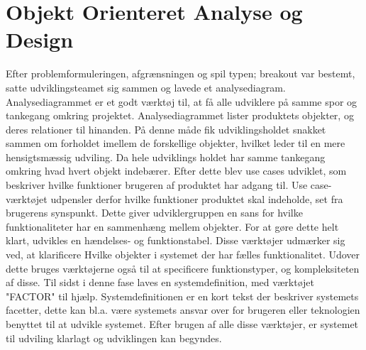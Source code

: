 \section{Objekt Orienteret Analyse og Design}
Efter problemformuleringen, afgrænsningen  og spil typen; breakout var bestemt, satte udviklingsteamet sig sammen og lavede et analysediagram. Analysediagrammet er et godt værktøj til, at få alle udviklere på samme spor og tankegang omkring projektet. Analysediagrammet lister produktets objekter, og deres relationer til hinanden. På denne måde fik udviklingsholdet snakket sammen om forholdet imellem de forskellige objekter, hvilket leder til en mere hensigtsmæssig udviling. Da hele udviklings holdet har samme tankegang omkring hvad hvert objekt indebærer. Efter dette blev use cases udviklet, som beskriver hvilke funktioner brugeren af produktet har adgang til. Use case-værktøjet udpensler derfor hvilke funktioner produktet skal indeholde, set fra brugerens synspunkt. Dette giver udviklergruppen en sans for hvilke funktionaliteter har en sammenhæng mellem objekter. For at gøre dette helt klart, udvikles en hændelses- og funktionstabel. Disse værktøjer udmærker sig ved, at klarificere Hvilke objekter i systemet der har fælles funktionalitet. Udover dette bruges værktøjerne også til at specificere funktionstyper, og kompleksiteten af disse. Til sidst i denne fase laves en systemdefinition, med værktøjet "FACTOR" til hjælp. Systemdefinitionen er en kort tekst der beskriver systemets facetter, dette kan bl.a. være systemets ansvar over for brugeren eller teknologien benyttet til at udvikle systemet. Efter brugen af alle disse værktøjer, er systemet til udviling klarlagt og udviklingen kan begyndes.